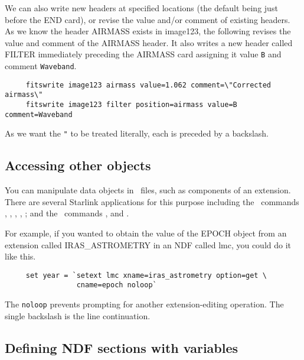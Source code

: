 We can also write new headers at specified locations (the default being
just before the END card), or revise the value and/or comment of existing
headers.  As we know the header AIRMASS exists in image123, the
following revises the value and comment of the AIRMASS header.
It also writes a new header called FILTER immediately preceding the
AIRMASS card assigning it value {\tt B} and comment {\tt Waveband}.

\small
\begin{verbatim}
     fitswrite image123 airmass value=1.062 comment=\"Corrected airmass\"
     fitswrite image123 filter position=airmass value=B comment=Waveband
\end{verbatim}
\normalsize

As we want the  {\tt "} to be
treated literally, each is preceded by a backslash.

\subsection{Accessing other objects
\label{sc4_se_other_objects}}

You can manipulate data objects in \HDSref\ files, such as components
of an  extension.  There are several Starlink
applications for this purpose including the \Figaroref\ commands
,
, ,
, ; and
the \KAPPAref\ commands , and
.

For example, if you wanted to obtain the value of the EPOCH object
from an extension called IRAS\_ASTROMETRY in an NDF called lmc,
you could do it like this. 

\small
\begin{verbatim}
     set year = `setext lmc xname=iras_astrometry option=get \
                 cname=epoch noloop`
\end{verbatim}
\normalsize
The {\tt noloop} prevents prompting for another extension-editing
operation.  The single backslash is the line continuation.

\subsection{Defining NDF sections with
variables\label{sc4_se_NDF_section}}

